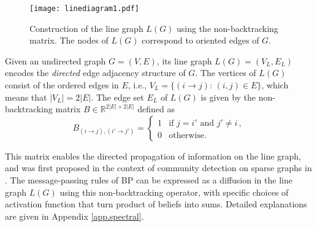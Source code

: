 \documentclass{article} \usepackage{iclr2019_conference,times}
\newcommand{\R}{\mathbb{R}}
\begin{document}
\begin{figure}
    \centering
    \texttt{[image: linediagram1.pdf]}\caption{Construction of the line graph $L(G)$ using the non-backtracking matrix. The nodes of $L(G)$ correspond to oriented edges of $G$.}
    \label{fig:linegraph1}
\end{figure}


Given an undirected graph $G=(V,E)$, its line graph $L(G)=(V_L, E_L)$ encodes the \textit{directed} edge adjacency structure of $G$. The vertices of $L(G)$ consist of the ordered edges in $E$, 
i.e., 
$V_L = \{ (i \to j): \, (i,j) \in E\}$, which means that 
$|V_L| = 2 |E|$.
The edge set $E_L$ of $L(G)$ is given by the non-backtracking matrix $B \in \R^{2|E| \times 2|E|}$ defined as $$B_{(i\to j), (i'\to j')}=\left\{ 
\begin{array}{cc}
1 & \text{if } j=i' \text{ and } j'\neq i\,,\\
0 & \text{otherwise.}
\end{array} \right.$$
\vspace{-0.25cm}

This matrix enables the directed propagation of information on the line graph, and was first proposed in the context of
community detection on sparse graphs in \cite{krzakala2013spectral}.
The message-passing rules of BP can be expressed as a diffusion in the line graph $L(G)$ using 
this non-backtracking operator, with specific choices of activation function that turn product of beliefs into sums. Detailed explanations are given in Appendix \ref{app.spectral}.
\end{document}
